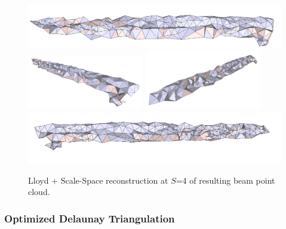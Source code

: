 \documentclass[12pt]{drexelthesis}
\let\Oldsubsubsection\subsubsection
\renewcommand{\subsubsection}{\FloatBarrier\Oldsubsubsection}
\begin{document}
\begin{figure}[!ht]
	\centering
		\includegraphics[width=5in]{real-lab-scans/optimizedNeat/scalespace4lloyd00.png}
		\includegraphics[width=2in]{real-lab-scans/optimizedNeat/scalespace4lloyd01.png}
		\includegraphics[width=2in]{real-lab-scans/optimizedNeat/scalespace4lloyd02.png}
		\includegraphics[width=5in]{real-lab-scans/optimizedNeat/scalespace4lloyd03.png}
		\caption[Lloyd + Scale-Space reconstruction at $S$=4 of segmented LiDAR data]{\centering Lloyd + Scale-Space reconstruction at $S$=4 of resulting beam point cloud.}
	\label{lidar:scalespace4lloyd}
\end{figure}


\subsubsection{Optimized Delaunay Triangulation}
\end{document}
